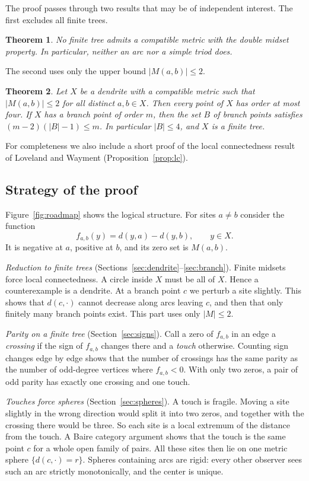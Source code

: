 \documentclass[11pt]{amsart}
\newtheorem{maintheorem}{Theorem}
\theoremstyle{definition}
\theoremstyle{remark}
\newcommand{\M}{M}
\begin{document}
The proof passes through two results that may be of independent interest. The first excludes all finite trees.

\begin{maintheorem}\label{thm:B}
No finite tree admits a compatible metric with the double midset property. In particular, neither an arc nor a simple triod does.
\end{maintheorem}

The second uses only the upper bound $|\M(a,b)|\le2$.

\begin{maintheorem}\label{thm:C}
Let $X$ be a dendrite with a compatible metric such that $|\M(a,b)|\le2$ for all distinct $a,b\in X$. Then every point of $X$ has order at most four. If $X$ has a branch point of order $m$, then the set $B$ of branch points satisfies $(m-2)(|B|-1)\le m$. In particular $|B|\le4$, and $X$ is a finite tree.
\end{maintheorem}

For completeness we also include a short proof of the local connectedness result of Loveland and Wayment (Proposition~\ref{prop:lc}).

\subsection{Strategy of the proof}
Figure~\ref{fig:roadmap} shows the logical structure. For sites $a\neq b$ consider the function
\[
  f_{a,b}(y)=d(y,a)-d(y,b),\qquad y\in X .
\]
It is negative at $a$, positive at $b$, and its zero set is $\M(a,b)$.

\emph{Reduction to finite trees} (Sections~\ref{sec:dendrite}--\ref{sec:branch}). Finite midsets force local connectedness. A circle inside $X$ must be all of $X$. Hence a counterexample is a dendrite. At a branch point $c$ we perturb a site slightly. This shows that $d(c,\cdot)$ cannot decrease along arcs leaving $c$, and then that only finitely many branch points exist. This part uses only $|\M|\le2$.

\emph{Parity on a finite tree} (Section~\ref{sec:signs}). Call a zero of $f_{a,b}$ in an edge a \emph{crossing} if the sign of $f_{a,b}$ changes there and a \emph{touch} otherwise. Counting sign changes edge by edge shows that the number of crossings has the same parity as the number of odd-degree vertices where $f_{a,b}<0$. With only two zeros, a pair of odd parity has exactly one crossing and one touch.

\emph{Touches force spheres} (Section~\ref{sec:spheres}). A touch is fragile. Moving a site slightly in the wrong direction would split it into two zeros, and together with the crossing there would be three. So each site is a local extremum of the distance from the touch. A Baire category argument shows that the touch is the same point $c$ for a whole open family of pairs. All these sites then lie on one metric sphere $\{d(c,\cdot)=r\}$. Spheres containing arcs are rigid: every other observer sees such an arc strictly monotonically, and the center is unique.
\end{document}
